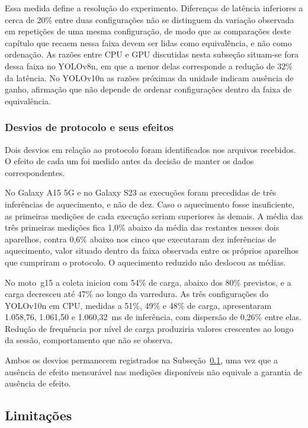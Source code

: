 \documentclass[artigo,times,capa]{iftex2024}
\begin{document}
Essa medida define a resolução do experimento. Diferenças de latência
inferiores a cerca de 20\% entre duas configurações não se distinguem da
variação observada em repetições de uma mesma configuração, de modo que as
comparações deste capítulo que recaem nessa faixa devem ser lidas como
equivalência, e não como ordenação. As razões entre \ac{CPU} e \ac{GPU}
discutidas nesta subseção situam-se fora dessa faixa no YOLOv8n, em que a
menor delas corresponde a redução de 32\% da latência. No YOLOv10n as razões
próximas da unidade indicam ausência de ganho, afirmação que não depende de
ordenar configurações dentro da faixa de equivalência.

\subsubsection{Desvios de protocolo e seus efeitos}
\label{sec:desvios_protocolo}

Dois desvios em relação ao protocolo foram identificados nos arquivos
recebidos. O efeito de cada um foi medido antes da decisão de manter os dados
correspondentes.

No Galaxy A15 5G e no Galaxy S23 as execuções foram precedidas de três
inferências de aquecimento, e não de dez. Caso o aquecimento fosse
insuficiente, as primeiras medições de cada execução seriam superiores às
demais. A média das três primeiras medições fica 1,0\% abaixo da média das
restantes nesses dois aparelhos, contra 0,6\% abaixo nos cinco que executaram
dez inferências de aquecimento, valor situado dentro da faixa observada entre
os próprios aparelhos que cumpriram o protocolo. O aquecimento reduzido não
deslocou as médias.

No moto~g15 a coleta iniciou com 54\% de carga, abaixo dos 80\% previstos, e a
carga decresceu até 47\% ao longo da varredura. As três configurações do
YOLOv10n em \ac{CPU}, medidas a 51\%, 49\% e 48\% de carga, apresentaram
1.058,76, 1.061,50 e 1.060,32~ms de inferência, com dispersão de 0,26\% entre
elas. Redução de frequência por nível de carga produziria valores crescentes
ao longo da sessão, comportamento que não se observa.

Ambos os desvios permanecem registrados na Subseção~\ref{sec:limitacoes}, uma
vez que a ausência de efeito mensurável nas medições disponíveis não equivale
a garantia de ausência de efeito.

\FloatBarrier

\subsection{Limitações}
\label{sec:limitacoes}
\end{document}
